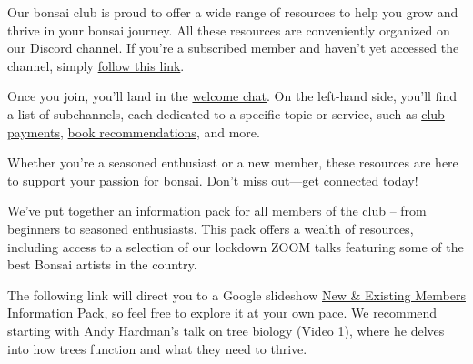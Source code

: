 \medskip
{}
\noindent  
Our bonsai club is proud to offer a wide range of resources to help you grow and thrive in your bonsai journey. All these resources are conveniently organized on our Discord channel. If you're a subscribed member and haven’t yet accessed the channel, simply \href{https://discord.gg/N6yka6XJ}{follow this link}.

Once you join, you'll land in the \href{https://discord.com/channels/873817545013071872/1118677826208550923}{welcome chat}. On the left\--hand side, you'll find a list of subchannels, each dedicated to a specific topic or service, such as \href{https://discord.com/channels/873817545013071872/1039691122148130876}{club payments}, \href{https://discord.com/channels/873817545013071872/1001189937409949698}{book recommendations}, and more. 

Whether you're a seasoned enthusiast or a new member, these resources are here to support your passion for bonsai. Don't miss out---get connected today!

\medskip	
{}
\noindent
We've put together an information pack for all members of the club – from beginners to seasoned enthusiasts. This pack offers a wealth of resources, including access to a selection of our lockdown ZOOM talks featuring some of the best Bonsai artists in the country.

The following link will direct you to a Google slideshow \href{https://docs.google.com/presentation/d/1L5SRA_ZSvnGMLbRt0CSf-Uz7BaiOfxOs7OUHMM_XrTY/edit?usp=sharing}{New \& Existing Members Information Pack}, so feel free to explore it at your own pace. We recommend starting with Andy Hardman’s talk on tree biology (Video 1), where he delves into how trees function and what they need to thrive.

	
	

\closearticle
\columnbreak
